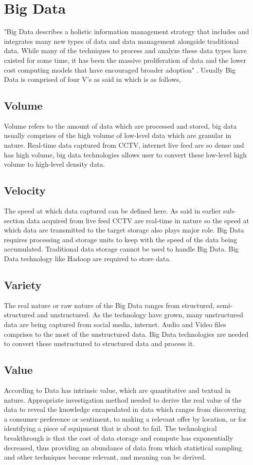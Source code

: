 \documentclass[sigconf]{acmart}
\begin{document}
\section{Big Data}
"Big Data describes a holistic information management strategy that includes and integrates many new types of data and data management alongside traditional data. While many of the techniques to process and analyze these data types have existed for some time, it has been the massive proliferation of data and the lower cost computing models that have encouraged broader adoption" \cite{bigdatadef}. Usually Big Data is comprised of four V's as said in \cite{bigdatadef} which is as follows,
\subsection{Volume}
Volume refers to the amount of data which are processed and stored, big data usually comprises of the high volume of low-level data which are granular in nature. Real-time data captured from CCTV, internet live feed are so dense and has high volume, big data technologies allows user to convert these low-level high volume to high-level density data.
\subsection{Velocity}
The speed at which data captured can be defined here. As said in earlier sub-section data acquired from live feed CCTV are real-time in nature so the speed at which data are transmitted to the target storage also plays major role. Big Data requires processing and storage units to keep with the speed of the data being accumulated. Traditional data storage cannot be used to handle Big Data. Big Data technology like Hadoop are required to store data.
\subsection{Variety}
The real nature or raw nature of the Big Data ranges from structured, semi-structured and unstructured. As the technology have grown, many unstructured data are being captured from social media, internet. Audio and Video files comprises to the most of the unstructured data. Big Data technologies are needed to convert these unstructured to structured data and process it. 
\subsection{Value}
According to \cite{bigdatadef} Data has intrinsic value, which are quantitative and textual in nature. Appropriate investigation method needed to derive the real value of the data to reveal the knowledge encapsulated in data which ranges from discovering a consumer preference or sentiment, to making a relevant offer by location, or for identifying a piece of equipment that is about to fail. The technological breakthrough is that the cost of data storage and compute has exponentially decreased, thus providing an abundance of data from which statistical sampling and other techniques become relevant, and meaning can be derived. 
\end{document}
